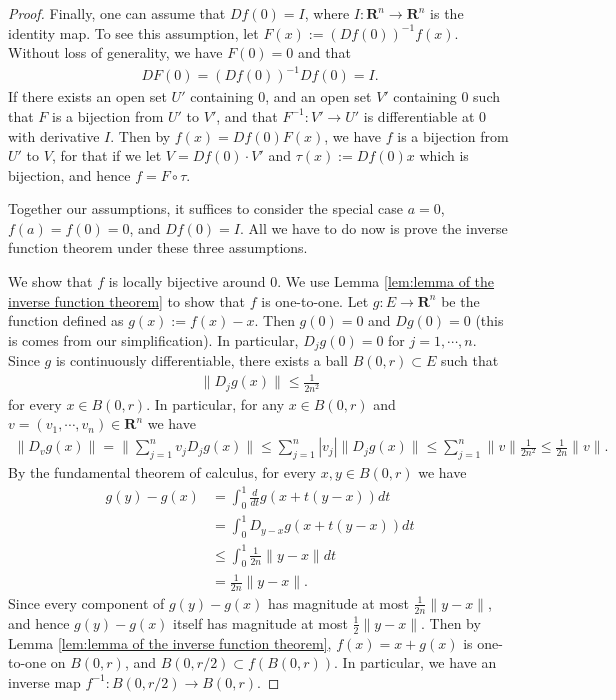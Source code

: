 \begin{proof}
    Finally, one can assume that $Df(0) = I$, where $I : \mathbf{R}^n \to \mathbf{R}^n$ is the identity map. To see this assumption, let $F(x) := (Df(0))^{-1}f(x)$. Without loss of generality, we have $F(0) = 0$ and that
        \begin{align*}
            DF(0) = (Df(0))^{-1}Df(0) = I.
        \end{align*}
    If there exists an open set $U'$ containing $0$, and an open set $V'$ containing $0$ such that $F$ is a bijection from $U'$ to $V'$, and that $F^{-1} : V' \to U'$ is differentiable at $0$ with derivative $I$. Then by $f(x) = Df(0)F(x)$, we have $f$ is a bijection from $U'$ to $V$, for that if we let $V = Df(0) \cdot V'$ and $\tau(x) := Df(0)x$ which is bijection, and hence $f = F \circ \tau$.

    Together our assumptions, it suffices to consider the special case $a = 0$, $f(a) = f(0) = 0$, and $Df(0) = I$. All we have to do now is prove the inverse function theorem under these three assumptions.

    We show that $f$ is locally bijective around $0$. We use Lemma \ref{lem:lemma of the inverse function theorem} to show that $f$ is one-to-one. Let $g : E \to \mathbf{R}^n$ be the function defined as $g(x) := f(x) - x$. Then $g(0) = 0$ and $Dg(0) = 0$ (this is comes from our simplification). In particular, $D_jg(0) = 0$ for $j = 1, \cdots, n$. Since $g$ is continuously differentiable, there exists a ball $B(0, r) \subset E$ such that
        \begin{align*}
        \|D_jg(x)\| \leq \frac{1}{2n^2}
        \end{align*}
for every $x \in B(0, r)$. In particular, for any $x \in B(0, r)$ and $v = (v_1, \cdots, v_n) \in \mathbf{R}^n$ we have
        \begin{align*}
            \|D_vg(x)\|
            = \Big\|\sum_{j = 1}^{n}v_jD_jg(x)\Big\|
            \leq \sum_{j = 1}^{n}|v_j|\|D_jg(x)\|
            \leq \sum_{j = 1}^{n}\|v\|\frac{1}{2n^2}
            \leq \frac{1}{2n}\|v\|.
        \end{align*}
    By the fundamental theorem of calculus, for every $x, y \in B(0, r)$ we have
        \begin{align*}
            g(y) - g(x) &= \int_{0}^{1}\frac{d}{dt}g(x + t(y - x))dt\\
            &= \int_{0}^{1}D_{y - x}g(x + t(y - x))dt\\
            &\leq \int_{0}^{1}\frac{1}{2n}\|y - x\|dt\\
            &= \frac{1}{2n}\|y - x\|.
        \end{align*}
    Since every component of $g(y) - g(x)$ has magnitude at most $\frac{1}{2n}\|y - x\|$, and hence $g(y) - g(x)$ itself has magnitude at most $\frac{1}{2}\|y - x\|$. Then by Lemma \ref{lem:lemma of the inverse function theorem}, $f(x) = x + g(x)$ is one-to-one on $B(0, r)$, and $B(0, r/2) \subset f(B(0, r))$. In particular, we have an inverse map $f^{-1} : B(0, r/2) \to B(0, r)$.


\end{proof}
